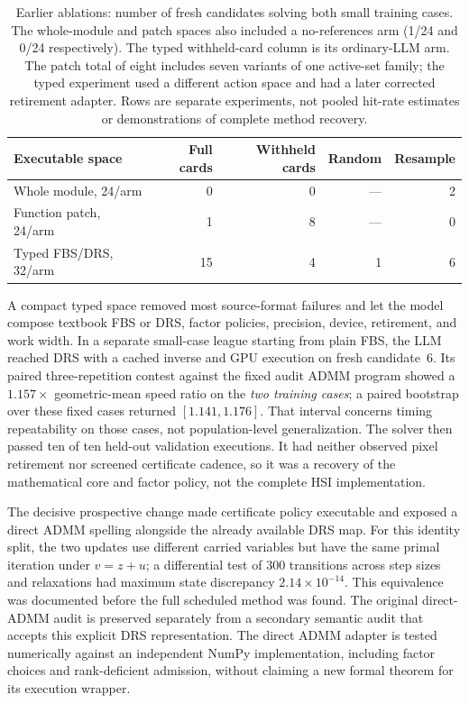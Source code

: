 \begin{table}[t]
\centering\small
\begin{tabular}{lrrrr}
\toprule
Executable space & Full cards & Withheld cards & Random & Resample \\
\midrule
Whole module, 24/arm & 0 & 0 & --- & 2 \\
Function patch, 24/arm & 1 & 8 & --- & 0 \\
Typed FBS/DRS, 32/arm & 15 & 4 & 1 & 6 \\
\bottomrule
\end{tabular}
\caption{Earlier ablations: number of fresh candidates solving both small
training cases. The whole-module and patch spaces also included a
no-references arm (1/24 and 0/24 respectively). The typed withheld-card column
is its ordinary-LLM arm. The patch total of eight includes seven variants of
one active-set family; the typed experiment used a different action space and
had a later corrected retirement adapter. Rows are separate experiments, not
pooled hit-rate estimates or demonstrations of complete method recovery.}
\label{tab:llm-loop-earlier-ablation}
\end{table}

A compact typed space removed most source-format failures and let the model
compose textbook FBS or DRS, factor policies, precision, device, retirement,
and work width. In a separate small-case league starting from plain FBS, the
LLM reached DRS with a cached inverse and GPU execution on fresh candidate~6.
Its paired three-repetition contest against the fixed audit ADMM program
showed a $1.157\times$ geometric-mean speed ratio on the \emph{two training
cases}; a paired bootstrap over these fixed cases returned
$[1.141,1.176]$. That interval concerns timing repeatability on those cases,
not population-level generalization. The solver then passed ten of ten held-out
validation executions. It had neither observed pixel retirement nor screened
certificate cadence, so it was a recovery of the mathematical core and factor
policy, not the complete HSI implementation.

The decisive prospective change made certificate policy executable and exposed
a direct ADMM spelling alongside the already available DRS map. For this
identity split, the two updates use different carried variables but have the
same primal iteration under $v=z+u$; a differential test of 300 transitions
across step sizes and relaxations had maximum state discrepancy
$2.14\times10^{-14}$. This equivalence was documented before the full scheduled
method was found. The original direct-ADMM audit is preserved separately from
a secondary semantic audit that accepts this explicit DRS representation.
The direct ADMM adapter is tested numerically against an independent NumPy
implementation, including factor choices and rank-deficient admission, without
claiming a new formal theorem for its execution wrapper.

